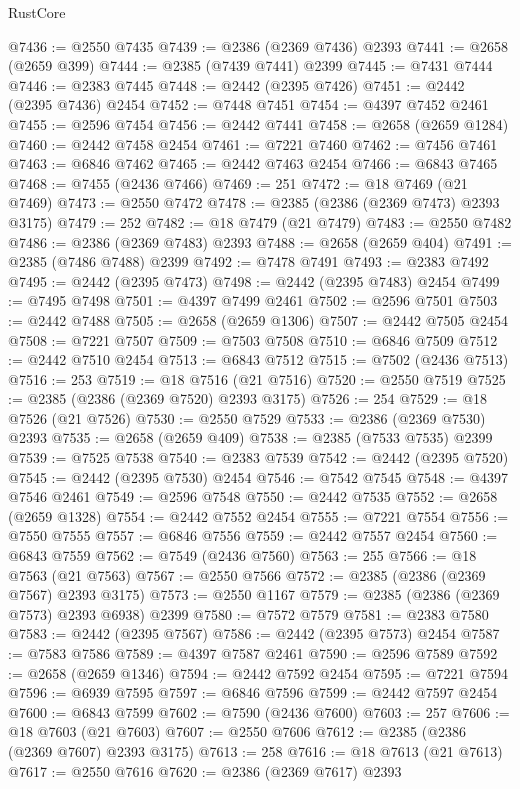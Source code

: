 \begin{lexlean}{RustCore}
\begin{coremodule}
@7436 := @2550 @7435
@7439 := @2386 (@2369 @7436) @2393
@7441 := @2658 (@2659 @399)
@7444 := @2385 (@7439 @7441) @2399
@7445 := @7431 @7444
@7446 := @2383 @7445
@7448 := @2442 (@2395 @7426)
@7451 := @2442 (@2395 @7436) @2454
@7452 := @7448 @7451
@7454 := @4397 @7452 @2461
@7455 := @2596 @7454
@7456 := @2442 @7441
@7458 := @2658 (@2659 @1284)
@7460 := @2442 @7458 @2454
@7461 := @7221 @7460
@7462 := @7456 @7461
@7463 := @6846 @7462
@7465 := @2442 @7463 @2454
@7466 := @6843 @7465
@7468 := @7455 (@2436 @7466)
@7469 := 251
@7472 := @18 @7469 (@21 @7469)
@7473 := @2550 @7472
@7478 := @2385 (@2386 (@2369 @7473) @2393 @3175)
@7479 := 252
@7482 := @18 @7479 (@21 @7479)
@7483 := @2550 @7482
@7486 := @2386 (@2369 @7483) @2393
@7488 := @2658 (@2659 @404)
@7491 := @2385 (@7486 @7488) @2399
@7492 := @7478 @7491
@7493 := @2383 @7492
@7495 := @2442 (@2395 @7473)
@7498 := @2442 (@2395 @7483) @2454
@7499 := @7495 @7498
@7501 := @4397 @7499 @2461
@7502 := @2596 @7501
@7503 := @2442 @7488
@7505 := @2658 (@2659 @1306)
@7507 := @2442 @7505 @2454
@7508 := @7221 @7507
@7509 := @7503 @7508
@7510 := @6846 @7509
@7512 := @2442 @7510 @2454
@7513 := @6843 @7512
@7515 := @7502 (@2436 @7513)
@7516 := 253
@7519 := @18 @7516 (@21 @7516)
@7520 := @2550 @7519
@7525 := @2385 (@2386 (@2369 @7520) @2393 @3175)
@7526 := 254
@7529 := @18 @7526 (@21 @7526)
@7530 := @2550 @7529
@7533 := @2386 (@2369 @7530) @2393
@7535 := @2658 (@2659 @409)
@7538 := @2385 (@7533 @7535) @2399
@7539 := @7525 @7538
@7540 := @2383 @7539
@7542 := @2442 (@2395 @7520)
@7545 := @2442 (@2395 @7530) @2454
@7546 := @7542 @7545
@7548 := @4397 @7546 @2461
@7549 := @2596 @7548
@7550 := @2442 @7535
@7552 := @2658 (@2659 @1328)
@7554 := @2442 @7552 @2454
@7555 := @7221 @7554
@7556 := @7550 @7555
@7557 := @6846 @7556
@7559 := @2442 @7557 @2454
@7560 := @6843 @7559
@7562 := @7549 (@2436 @7560)
@7563 := 255
@7566 := @18 @7563 (@21 @7563)
@7567 := @2550 @7566
@7572 := @2385 (@2386 (@2369 @7567) @2393 @3175)
@7573 := @2550 @1167
@7579 := @2385 (@2386 (@2369 @7573) @2393 @6938) @2399
@7580 := @7572 @7579
@7581 := @2383 @7580
@7583 := @2442 (@2395 @7567)
@7586 := @2442 (@2395 @7573) @2454
@7587 := @7583 @7586
@7589 := @4397 @7587 @2461
@7590 := @2596 @7589
@7592 := @2658 (@2659 @1346)
@7594 := @2442 @7592 @2454
@7595 := @7221 @7594
@7596 := @6939 @7595
@7597 := @6846 @7596
@7599 := @2442 @7597 @2454
@7600 := @6843 @7599
@7602 := @7590 (@2436 @7600)
@7603 := 257
@7606 := @18 @7603 (@21 @7603)
@7607 := @2550 @7606
@7612 := @2385 (@2386 (@2369 @7607) @2393 @3175)
@7613 := 258
@7616 := @18 @7613 (@21 @7613)
@7617 := @2550 @7616
@7620 := @2386 (@2369 @7617) @2393

\end{coremodule}
\end{lexlean}
